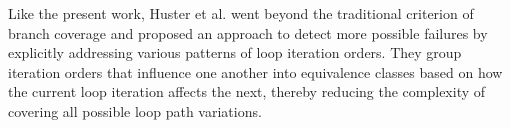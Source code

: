 Like the present work, Huster et al. \cite{huster2015efficient} went beyond the traditional criterion of branch coverage and proposed an approach to detect more possible failures by explicitly addressing various patterns of loop iteration orders. They group iteration orders that influence one another into equivalence classes based on how the current loop iteration affects the next, thereby reducing the complexity of covering all possible loop path variations.